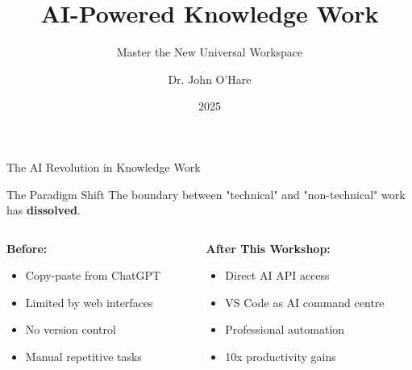 \documentclass{beamer}
\title{AI-Powered Knowledge Work}
\subtitle{Master the New Universal Workspace}
\author{Dr. John O'Hare}
\institute{DREAMLAB | HP AI Lighthouse Partner}
\date{2025}
\newcommand{\highlight}[1]{\textcolor{aiblue}{\textbf{#1}}}
\begin{document}
\begin{frame}[plain]
\titlepage
\end{frame}

\begin{frame}{The AI Revolution in Knowledge Work}
\begin{block}{The Paradigm Shift}
The boundary between "technical" and "non-technical" work has \highlight{dissolved}.
\end{block}
\vspace{0.5em}
\begin{columns}[T]
\begin{column}{0.48\textwidth}
\textbf{Before:}
\begin{itemize}
\item Copy-paste from ChatGPT
\item Limited by web interfaces
\item No version control
\item Manual repetitive tasks
\end{itemize}
\end{column}
\begin{column}{0.48\textwidth}
\textbf{After This Workshop:}
\begin{itemize}
\item Direct AI API access
\item VS Code as AI command centre
\item Professional automation
\item 10x productivity gains
\end{itemize}
\end{column}
\end{columns}
\end{frame}
\end{document}

